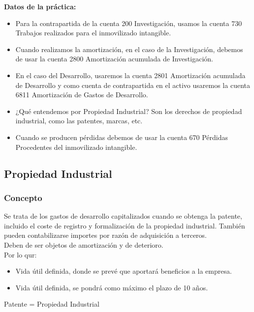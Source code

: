 \documentclass[a4paper,12pt]{article}
\begin{document}
\textbf{Datos de la práctica:
}\begin{itemize}
    \item Para la contrapartida de la cuenta 200 Investigación, usamos la cuenta 730 Trabajos realizados para el inmovilizado intangible.
    \item Cuando realizamos la amortización, en el caso de la Investigación, debemos de usar la cuenta 2800 Amortización acumulada de Investigación.
    \item En el caso del Desarrollo, usaremos la cuenta 2801 Amortización acumulada de Desarrollo y como cuenta de contrapartida en el activo usaremos la cuenta 6811 Amortización de Gastos de Desarrollo.
    \item ¿Qué entendemos por Propiedad Industrial? Son los derechos de propiedad industrial, como las patentes, marcas, etc.
    \item Cuando se producen pérdidas debemos de usar la cuenta 670 Pérdidas Procedentes del inmovilizado intangible.
\end{itemize}

\subsection{Propiedad Industrial}

\subsubsection{Concepto} 
Se trata de los gastos de desarrollo capitalizados cuando se obtenga la patente, incluido el coste de registro y formalización de la propiedad industrial. También pueden contabilizarse importes por razón de adquisición a terceros.\\

Deben de ser objetos de amortización y de deterioro.\\
Por lo qur:
\begin{itemize}
    \item Vida útil definida, donde se prevé que aportará beneficios a la empresa.
    \item Vida útil definida, se pondrá como máximo el plazo de 10 años.
\end{itemize}

\begin{tcolorbox}[colback=green!5!white,colframe=green!75!black, title=Aclaración]
    Patente = Propiedad Industrial
\end{tcolorbox}
\end{document}
